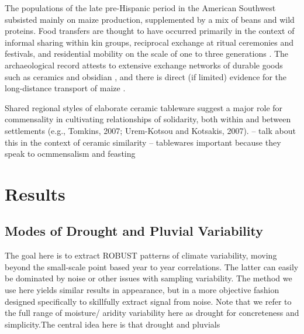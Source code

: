 \documentclass[fleqn,10pt]{wlscirep}
\begin{document}
The populations of the late pre-Hispanic period in the American Southwest subsisted mainly on maize production, supplemented by a mix of beans and wild proteins. Food transfers are thought to have occurred primarily in the context of informal sharing within kin groups, reciprocal exchange at ritual ceremonies and festivals, and residential mobility on the scale of one to three generations \cite{Hegmon1991,Hegmon1996,Kohler1996TheAnasazi,Varien1999SedentismBeyond,Cordell2007MesaMigration}. The archaeological record attests to extensive exchange networks of durable goods such as ceramics and obsidian \cite{Mills2013a}, and there is direct (if limited) evidence for the long-distance transport of maize \cite{Benson2009PossibleMexico,Benson2010WhoDrought}.


Shared
regional styles of elaborate ceramic tableware suggest a major role
for commensality in cultivating relationships of solidarity, both
within and between settlements (e.g., Tomkins, 2007; Urem-Kotsou
and Kotsakis, 2007). -- talk about this in the context of ceramic similarity -- tablewares important because they speak to ocmmensalism and feasting

\section*{Results}

\subsection*{Modes of Drought and Pluvial Variability}

The goal here is to extract ROBUST patterns of climate variability, moving beyond the small-scale point based year to year correlations. The latter can easily be dominated by noise or other issues with sampling variability. The method we use here yields similar results in appearance, but in a more objective fashion designed specifically to skillfully extract signal from noise.
Note that we refer to the full range of moisture/ aridity variability here as drought for concreteness and simplicity.The central idea here is that drought and pluvials
\end{document}
